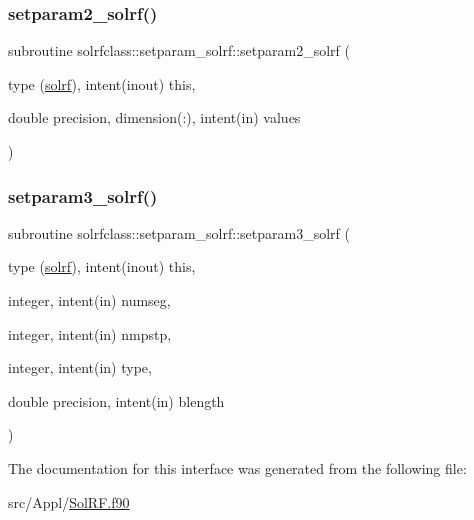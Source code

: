 \mbox{\label{interfacesolrfclass_1_1setparam__solrf_ac4d08aea115d7001f0c7f48ddaf5fa96}} 
\subsubsection{\texorpdfstring{setparam2\_solrf()}{setparam2\_solrf()}}
{\footnotesize\ttfamily subroutine solrfclass\+::setparam\+\_\+solrf\+::setparam2\+\_\+solrf (\begin{DoxyParamCaption}\item[{type (\mbox{\hyperlink{namespacesolrfclass_structsolrfclass_1_1solrf}{solrf}}), intent(inout)}]{this,  }\item[{double precision, dimension(\+:), intent(in)}]{values }\end{DoxyParamCaption})}

\mbox{\label{interfacesolrfclass_1_1setparam__solrf_aeab1a4f531a4a46b458217a3395f1198}} 
\subsubsection{\texorpdfstring{setparam3\_solrf()}{setparam3\_solrf()}}
{\footnotesize\ttfamily subroutine solrfclass\+::setparam\+\_\+solrf\+::setparam3\+\_\+solrf (\begin{DoxyParamCaption}\item[{type (\mbox{\hyperlink{namespacesolrfclass_structsolrfclass_1_1solrf}{solrf}}), intent(inout)}]{this,  }\item[{integer, intent(in)}]{numseg,  }\item[{integer, intent(in)}]{nmpstp,  }\item[{integer, intent(in)}]{type,  }\item[{double precision, intent(in)}]{blength }\end{DoxyParamCaption})}



The documentation for this interface was generated from the following file\+:\begin{DoxyCompactItemize}
\item 
src/\+Appl/\mbox{\hyperlink{_sol_r_f_8f90}{Sol\+R\+F.\+f90}}\end{DoxyCompactItemize}
